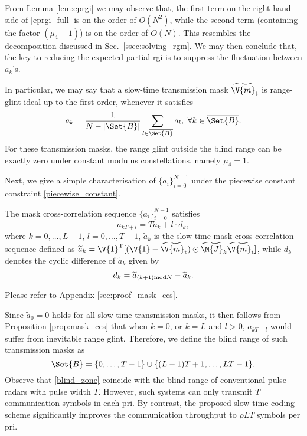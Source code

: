 \documentclass[journal,a4paper,10pt, romanappendices]{IEEEtran}
\begin{document}
From Lemma \ref{lem:eprgi} we may observe that, the first term on the right-hand side of \eqref{eprgi_full} is on the order of $O(N^2)$, while the second term (containing the factor $(\mu_4-1)$) is on the order of $O(N)$. This resembles the decomposition discussed in Sec.~\ref{ssec:solving_rgm}. We may then conclude that, the key to reducing the expected partial \ac{rgi} is to suppress the fluctuation between $a_k$'s. 
\begin{remark}
In particular, we may say that a slow-time transmission mask $\widetilde{\V{m}}_{\rm t}$ is range-glint-ideal up to the first order, whenever it satisfies
\begin{equation}\label{rgi_1st}
a_k=\frac{1}{N-|\Set{B}|}\sum_{l\in\overline{\Set{B}}}a_l,~\forall k\in\overline{\Set{B}}.
\end{equation}
For these transmission masks, the range glint outside the blind range can be exactly zero under constant modulus constellations, namely $\mu_4=1$.
\end{remark} 

Next, we give a simple characterisation of $\{a_i\}_{i=0}^{N-1}$ under the piecewise constant constraint \eqref{piecewise_constant}.
\begin{proposition}\label{prop:mask_ccs}
The mask cross-correlation sequence $\{a_i\}_{i=0}^{N-1}$ satisfies
\begin{equation}\label{mask_ccs}
a_{kT+l} = T\widetilde{a}_k + l \cdot d_k,
\end{equation}
where $k=0,\dotsc,L-1$, $l=0,\dotsc,T-1$, $\widetilde{a}_k$ is the slow-time mask cross-correlation sequence defined as
$\widetilde{a}_k = \V{1}^{\rm T}[(\V{1}-\widetilde{\V{m}}_{\rm t})\odot \widetilde{\M{J}}_k\widetilde{\V{m}}_{\rm t}]$, while $d_k$ denotes the cyclic difference of $\widetilde{a}_k$ given by
$$
d_k = \widetilde{a}_{(k+1){\rm mod}N}- \widetilde{a}_k.
$$
\begin{IEEEproof}
Please refer to Appendix \ref{sec:proof_mask_ccs}.
\end{IEEEproof}
\end{proposition}

Since $\widetilde{a}_0=0$ holds for all slow-time transmission masks, it then follows from Proposition \ref{prop:mask_ccs} that when $k=0$, or $k=L$ and $l>0$, $a_{kT+l}$ would suffer from inevitable range glint. Therefore, we define the blind range of such transmission masks as
\begin{equation}\label{blind_zone}
\Set{B} = \{0,\dotsc,T-1\}\cup \{(L-1)T+1,\dotsc, LT-1\}.
\end{equation}
Observe that \eqref{blind_zone} coincide with the blind range of conventional pulse radars with pulse width $T$. However, such systems can only transmit $T$ communication symbols in each \ac{pri}. By contrast, the proposed slow-time coding scheme significantly improves the communication throughput to $\rho LT$ symbols per \ac{pri}.
\end{document}
